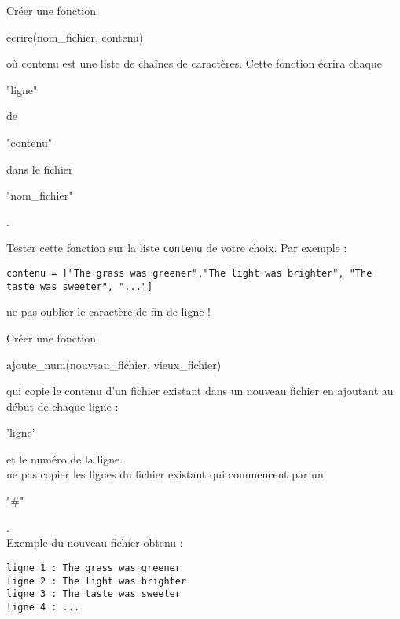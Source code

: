 \pagebreak

\begin{enonce}
	[Ecriture]

	\ques Créer une fonction \begin{texttt}ecrire(nom\_fichier, contenu)\end{texttt} où contenu est une liste de chaînes de caractères. Cette fonction écrira chaque \begin{texttt}"ligne"\end{texttt} de \begin{texttt}"contenu"\end{texttt} dans le fichier \begin{texttt}"nom\_fichier"\end{texttt}.

	Tester cette fonction sur la liste \texttt{contenu} de votre choix. Par exemple :\\

	\begin{verbatim}
contenu = ["The grass was greener","The light was brighter", "The taste was sweeter", "..."]

\end{verbatim}

	 ne pas oublier le caractère de fin de ligne !

	\ques Créer une fonction \begin{texttt}ajoute\_num(nouveau\_fichier, vieux\_fichier)\end{texttt} qui copie le contenu d'un fichier existant dans un nouveau fichier en ajoutant au début de chaque ligne : \begin{texttt}'ligne'\end{texttt} et le numéro de la ligne. \\

	 ne pas copier les lignes du fichier existant qui commencent par un \begin{texttt}"\#"\end{texttt}.\\

	Exemple du nouveau fichier obtenu :\\

	\begin{verbatim}
ligne 1 : The grass was greener
ligne 2 : The light was brighter
ligne 3 : The taste was sweeter
ligne 4 : ...
\end{verbatim}

\end{enonce}

